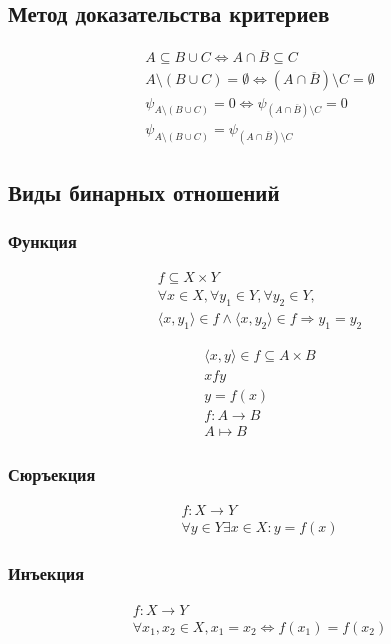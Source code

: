 \documentclass{article}
\begin{document}
\subsection{Метод доказательства критериев}

\begin{gather*}
	A \subseteq B \cup C \Leftrightarrow A \cap \overline{B} \subseteq C \\
	A \setminus (B \cup C) = \emptyset \Leftrightarrow (A \cap \overline{B}) \setminus C = \emptyset \\
	\psi_{A \setminus (B \cup C)} = 0 \Leftrightarrow \psi_{(A \cap \overline{B}) \setminus C} = 0 \\
	\psi_{A \setminus (B \cup C)} = \psi_{(A \cap \overline{B}) \setminus C}
\end{gather*}	

\subsection{Виды бинарных отношений}

\subsubsection{Функция}

\begin{gather*}
	f \subseteq X \times Y \\
	\forall x \in X, \forall y_1 \in Y, \forall y_2 \in Y, \\
	\langle x, y_1 \rangle \in f \land \langle x, y_2 \rangle \in f \Rightarrow y_1 = y_2
\end{gather*}

\begin{gather*}
	\langle x, y \rangle \in f \subseteq A \times B \\
	x f y \\
	y = f(x) \\
	f: A \to B \\
	A \mapsto B
\end{gather*}

\subsubsection{Сюръекция}
\begin{gather*}
	f : X \to Y \\
	\forall y \in Y \exists x \in X : y = f(x)
\end{gather*}

\subsubsection{Инъекция}
\begin{gather*}
	f : X \to Y \\
	\forall x_1, x_2 \in X, x_1 = x_2 \Leftrightarrow f(x_1) = f(x_2)
\end{gather*}
\end{document}
